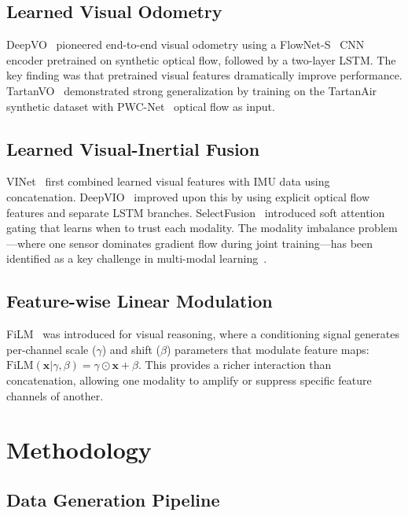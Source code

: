 \documentclass[conference]{IEEEtran}
\begin{document}
\subsection{Learned Visual Odometry}
DeepVO~\cite{wang2017} pioneered end-to-end visual odometry using a FlowNet-S~\cite{dosovitskiy2015} CNN encoder pretrained on synthetic optical flow, followed by a two-layer LSTM. The key finding was that pretrained visual features dramatically improve performance. TartanVO~\cite{wang2021} demonstrated strong generalization by training on the TartanAir~\cite{wang2020tartanair} synthetic dataset with PWC-Net~\cite{sun2018} optical flow as input.

\subsection{Learned Visual-Inertial Fusion}
VINet~\cite{clark2017} first combined learned visual features with IMU data using concatenation. DeepVIO~\cite{han2019} improved upon this by using explicit optical flow features and separate LSTM branches. SelectFusion~\cite{chen2019} introduced soft attention gating that learns when to trust each modality. The modality imbalance problem---where one sensor dominates gradient flow during joint training---has been identified as a key challenge in multi-modal learning~\cite{wang2020multimodal}.

\subsection{Feature-wise Linear Modulation}
FiLM~\cite{perez2018} was introduced for visual reasoning, where a conditioning signal generates per-channel scale ($\gamma$) and shift ($\beta$) parameters that modulate feature maps: $\text{FiLM}(\mathbf{x} | \gamma, \beta) = \gamma \odot \mathbf{x} + \beta$. This provides a richer interaction than concatenation, allowing one modality to amplify or suppress specific feature channels of another.

\section{Methodology}

\subsection{Data Generation Pipeline}
\end{document}

